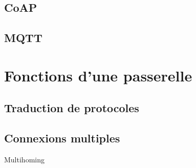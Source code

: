 \lipsum

\subsection{CoAP} %
\label{sub:coap}

\lipsum


\subsection{MQTT} %
\label{sub:mqtt}

\lipsum



\section{Fonctions d'une passerelle} %
\label{sec:fonctions_d_une_passerelle}

\subsection{Traduction de protocoles} %
\label{sub:traduction_de_protocoles}

\lipsum


\subsection{Connexions multiples} %
\label{sub:connexions_multiples}

Multihoming



